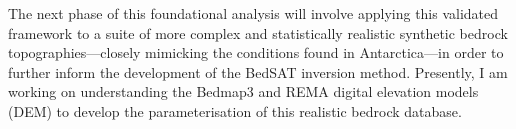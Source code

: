 The next phase of this foundational analysis will involve applying this validated framework to a suite of more complex and statistically realistic synthetic bedrock topographies—closely mimicking the conditions found in Antarctica—in order to further inform the development of the BedSAT inversion method. Presently, I am working on understanding the Bedmap3 and REMA digital elevation models (DEM) to develop the parameterisation of this realistic bedrock database.



